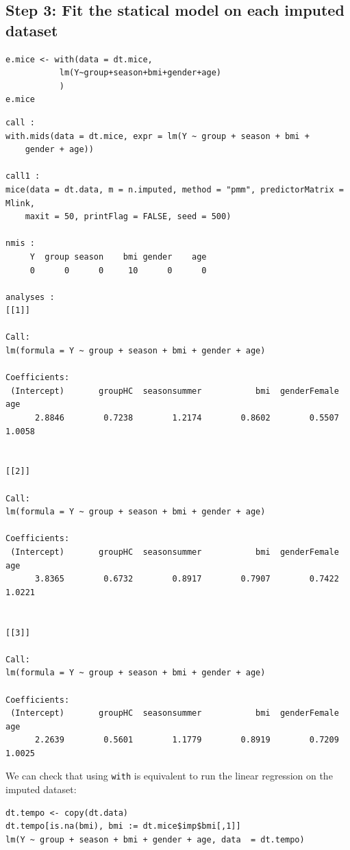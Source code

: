 \documentclass[12pt]{article}
\begin{document}
\clearpage

\subsection{Step 3: Fit the statical model on each imputed dataset}
\label{sec:orgb1d7d91}

\lstset{language=r,label= ,caption= ,captionpos=b,numbers=none}
\begin{lstlisting}
e.mice <- with(data = dt.mice,
	       lm(Y~group+season+bmi+gender+age)
	       )
e.mice
\end{lstlisting}

\begin{verbatim}
call :
with.mids(data = dt.mice, expr = lm(Y ~ group + season + bmi + 
    gender + age))

call1 :
mice(data = dt.data, m = n.imputed, method = "pmm", predictorMatrix = Mlink, 
    maxit = 50, printFlag = FALSE, seed = 500)

nmis :
     Y  group season    bmi gender    age 
     0      0      0     10      0      0 

analyses :
[[1]]

Call:
lm(formula = Y ~ group + season + bmi + gender + age)

Coefficients:
 (Intercept)       groupHC  seasonsummer           bmi  genderFemale           age  
      2.8846        0.7238        1.2174        0.8602        0.5507        1.0058  


[[2]]

Call:
lm(formula = Y ~ group + season + bmi + gender + age)

Coefficients:
 (Intercept)       groupHC  seasonsummer           bmi  genderFemale           age  
      3.8365        0.6732        0.8917        0.7907        0.7422        1.0221  


[[3]]

Call:
lm(formula = Y ~ group + season + bmi + gender + age)

Coefficients:
 (Intercept)       groupHC  seasonsummer           bmi  genderFemale           age  
      2.2639        0.5601        1.1779        0.8919        0.7209        1.0025
\end{verbatim}

We can check that using \texttt{with} is equivalent to run the linear
regression on the imputed dataset:
\lstset{language=r,label= ,caption= ,captionpos=b,numbers=none}
\begin{lstlisting}
dt.tempo <- copy(dt.data)
dt.tempo[is.na(bmi), bmi := dt.mice$imp$bmi[,1]]
lm(Y ~ group + season + bmi + gender + age, data  = dt.tempo)
\end{lstlisting}
\end{document}
